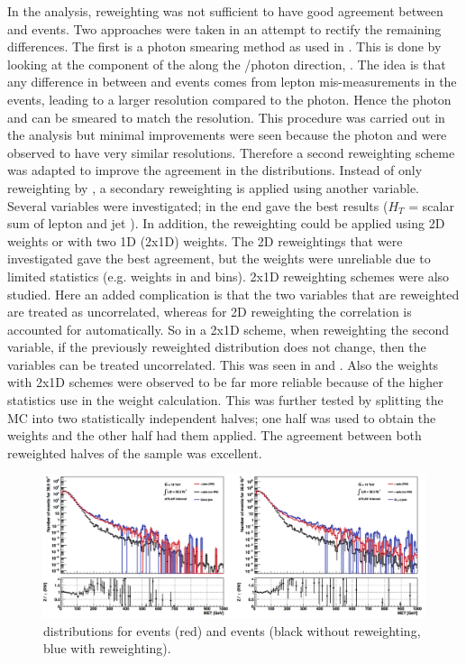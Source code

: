 In the \monoZ analysis, \pt reweighting was not sufficient to have good agreement between \gjets and \Zjets events. Two approaches were taken in an attempt to rectify the remaining differences. The first is a photon smearing method as used in \cite{Galster:2151990}. This is done by looking at the component of the \etmiss along the \Z/photon direction, \etmisspar. The idea is that any difference in \etmisspar between \Zjets and \gjets events comes from lepton mis-measurements in the \Zjets events, leading to a larger \Z resolution compared to the photon. Hence the photon \pt and \etmisspar can be smeared to match the \Z resolution. This procedure was carried out in the \monoZ analysis but minimal improvements were seen because the photon and \Z were observed to have very similar resolutions. Therefore a second reweighting scheme was adapted to improve the agreement in the \etmiss distributions. Instead of only reweighting by \pt, a secondary reweighting is applied using another variable. Several variables were investigated; in the end \etmissht gave the best results ($H_T$ = scalar sum of lepton \pt and jet \pt). In addition, the reweighting could be applied using 2D weights or with two 1D (2x1D) weights. The 2D reweightings that were investigated gave the best \etmiss agreement, but the weights were unreliable due to limited statistics (e.g. weights in \pt and \etmissht bins). 2x1D reweighting schemes were also studied. Here an added complication is that the two variables that are reweighted are treated as uncorrelated, whereas for 2D reweighting the correlation is accounted for automatically. So in a 2x1D scheme, when reweighting the second variable, if the previously reweighted \pt distribution does not change, then the variables can be treated uncorrelated. This was seen in \pt and \etmissht. Also the weights with 2x1D schemes were observed to be far more reliable because of the higher statistics use in the weight calculation. This was further tested by splitting the \gjets MC into two statistically independent halves; one half was used to obtain the weights and the other half had them applied. The agreement between both reweighted halves of the \gjets sample was excellent. 

\begin{figure}[h]
\centering
\includegraphics[width=1\textwidth]{Figures/gjets.png}
\caption{\etmiss distributions for \gjets events (red) and \Zjets events (black without reweighting, blue with reweighting).}
\label{fig:gjets}
\end{figure}

